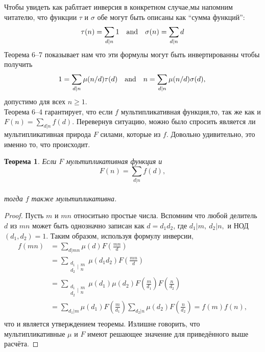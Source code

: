 \documentclass[11pt]{article}
\newtheorem{theorem}{Теорема}
\begin{document}
Чтобы увидеть как раблтает инверсия в конкретном случае,мы напомним читателю, что функции $\tau$ и $\sigma$ обе могут быть описаны как ``сумма функций'':\\
\[\tau(n) = \sum \limits_{d\mid n} 1
\text{\quad and\quad}
\sigma(n) =\sum \limits_{d\mid n} d\]
Теорема 6--7 показывает нам что эти формулы могут быть инвертированны чтобы получить\\
\[
1=\sum_{d|n}\mu(n/d)\tau(d)
\text{\quad and\quad} 
n=\sum_{d|n}\mu(n/d)\sigma(d),\\
\]
допустимо для всех $n\ge1$.\\

Теорема 6--4 гарантирует, что если $f$ мультипликативная функция,то, так же как и
$F(n)=\sum_{d|n}f(d)$.
Перевернув ситуацию, можно было спросить является ли мультипликативная природа $F$ силами, которые из $f$. 
Довольно удивительно, это именно то, что происходит.\\[5mm]
\begin{theorem}
\label{ Теорема 6--8.} {\it Если $F$ мультипликативная функция и}\\
\[
F(n)=\sum_{d|n}f(d),\]\\
{\it тогда $f$ также мультипликативна.}\end{theorem}
\begin{proof}
Пусть $m$ и $mn$ относитьно простые числа. Вспомним что любой делитель $d$ из $mn$ может быть однозначно записан как $d=d_1d_2$, где $d_1|m,~d_2|n,$ и НОД$(d_1{,} d_2)=1$. Таким образом, используя формулу инверсии,\\
\begin{align*}
f(mn)&=\sum_{d|mn}\mu(d)F\left(\frac{mn}d \right)\\
&=\sum_{\begin{matrix} d_1 \\ d_2 \end{matrix}|\begin{matrix} m \\ n \end{matrix}}\mu(d_1d_2)F\left(\frac{mn}d \right)\\
&=\sum_{\begin{matrix} d_1 \\ d_2 \end{matrix}|\begin{matrix} m \\ n \end{matrix}}
\mu(d_1)\mu(d_2)F\left(\frac m{d_1}\right)F\left(\frac n{d_2}\right)\\
&=\sum_{d_1|m}\mu(d_1)F\left(\frac m{d_1}\right)\sum_{d_2|n}\mu(d_2)F\left( \frac n{d_2}\right)=f(m)f(n),\\
\end{align*}
что и является утверждением теоремы. Излишне говорить, что мультипликативные  $\mu$ и $F$ имеют решающее значение для приведённого выше расчёта.
\end{proof}
\end{document}
